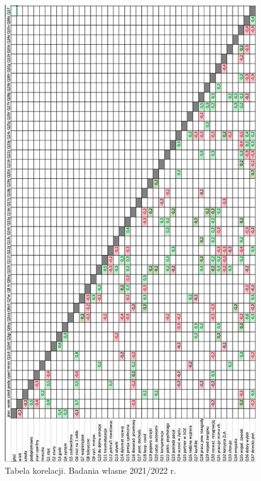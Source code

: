 \documentclass[a4paper,12pt,twoside,openright]{mwrep}
\begin{document}
\begin{appendices}
\begin{figure}[H]
\centering
\includegraphics[width=11cm]{wyniki/crosstable90}
\caption{Tabela korelacji. Badania własne 2021/2022 r.}
\label{rys:crosstable}
\end{figure}


\end{appendices}


\end{document}
